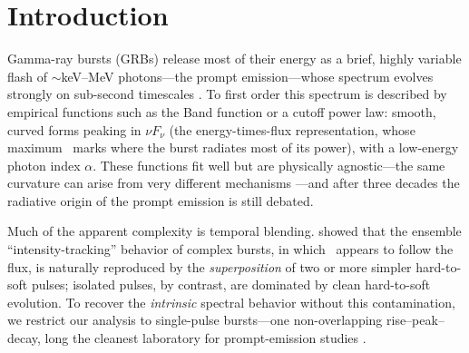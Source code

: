 \section{Introduction} \label{sec:intro}

Gamma-ray bursts (GRBs) release most of their energy as a brief, highly variable
flash of $\sim$keV--MeV photons---the prompt emission---whose spectrum evolves
strongly on sub-second timescales \citep{Norris1996,Kaneko2006,Lu2012,Yu2016}.
To first order this spectrum is described by empirical functions such as the Band
function \citep{Band1993} or a cutoff power law: smooth, curved forms peaking in
$\nu F_\nu$ (the energy-times-flux representation, whose maximum \Ep\ marks where
the burst radiates most of its power), with a low-energy photon index $\alpha$.
These functions fit well but are physically agnostic---the same curvature can
arise from very different mechanisms \citep{KumarZhang2015}---and after three
decades the radiative origin of the prompt emission is still debated.

Much of the apparent complexity is temporal blending. \citet{HakkilaPreece2011}
showed that the ensemble ``intensity-tracking'' behavior of complex bursts, in
which \Ep\ appears to follow the flux, is naturally reproduced by the
\emph{superposition} of two or more simpler hard-to-soft pulses; isolated pulses,
by contrast, are dominated by clean hard-to-soft evolution. To recover the
\emph{intrinsic} spectral behavior without this contamination, we restrict our
analysis to single-pulse bursts---one non-overlapping rise--peak--decay, long the
cleanest laboratory for prompt-emission studies
\citep{RydePeer2009,Basak2014,Yu2016,Busby2024}.

